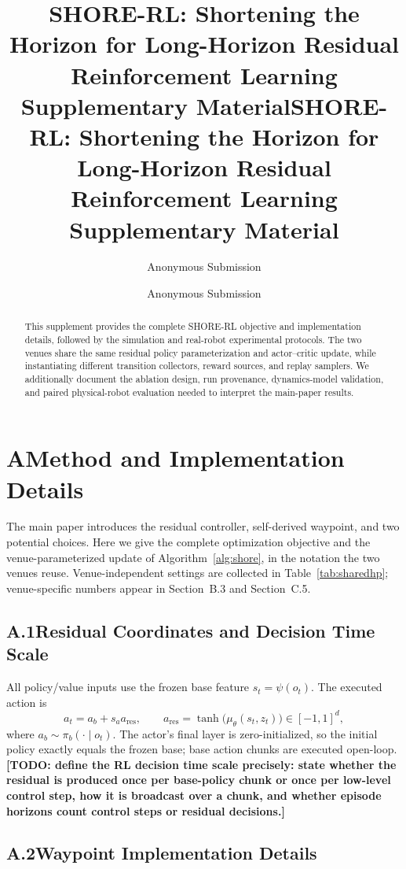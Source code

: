 \documentclass[letterpaper]{article} %
\title{SHORE-RL: Shortening the Horizon for Long-Horizon Residual\\
    Reinforcement Learning\\
    \vspace{0.5em}\large Supplementary Material}
\title{SHORE-RL: Shortening the Horizon for Long-Horizon Residual\\
    Reinforcement Learning\\
    \vspace{0.5em}\large Supplementary Material}
\author{
    Anonymous Submission
}
\author{
    Anonymous Submission
}
\newcommand{\todo}[1]{\textbf{[TODO: #1]}}
\begin{document}
\maketitle

\begin{abstract}
This supplement provides the complete SHORE-RL objective and implementation details,
followed by the simulation and real-robot experimental protocols. The two venues share
the same residual policy parameterization and actor--critic update, while instantiating
different transition collectors, reward sources, and replay samplers. We additionally
document the ablation design, run provenance, dynamics-model validation, and paired
physical-robot evaluation needed to interpret the main-paper results.
\end{abstract}


\section{A\quad Method and Implementation Details}

The main paper introduces the residual controller, self-derived waypoint, and two
potential choices. Here we give the complete optimization objective and the venue-parameterized update of
Algorithm~\ref{alg:shore}, in the notation the two venues reuse. Venue-independent settings
are collected in Table~\ref{tab:sharedhp}; venue-specific numbers appear in Section~B.3 and
Section~C.5.

\subsection{A.1\quad Residual Coordinates and Decision Time Scale}

All policy/value inputs use the frozen base feature $s_t=\psi(o_t)$. The executed action is
\[
a_t=a_b+s_a a_{\mathrm{res}},\qquad
a_{\mathrm{res}}=\tanh\!\big(\mu_\theta(s_t,z_t)\big)\in[-1,1]^d,
\]
where $a_b\sim\pi_b(\cdot\mid o_t)$. The actor's final layer is zero-initialized, so the
initial policy exactly equals the frozen base; base action chunks are executed open-loop.
\todo{define the RL decision time scale precisely: state whether the residual is produced
once per base-policy chunk or once per low-level control step, how it is broadcast over a
chunk, and whether episode horizons count control steps or residual decisions.}

\subsection{A.2\quad Waypoint Implementation Details}
\end{document}

